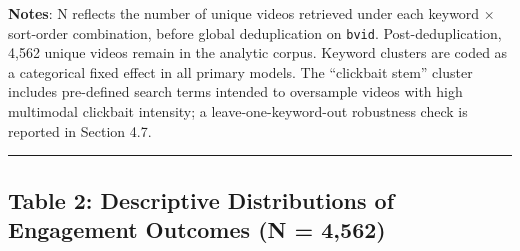 \documentclass[
  12pt,
]{article}
\begin{document}
\textbf{Notes}: N reflects the number of unique videos retrieved under
each keyword × sort-order combination, before global deduplication on
\texttt{bvid}. Post-deduplication, 4,562 unique videos remain in the
analytic corpus. Keyword clusters are coded as a categorical fixed
effect in all primary models. The ``clickbait stem'' cluster includes
pre-defined search terms intended to oversample videos with high
multimodal clickbait intensity; a leave-one-keyword-out robustness check
is reported in Section 4.7.

\begin{center}\rule{0.5\linewidth}{0.5pt}\end{center}

\subsection{Table 2: Descriptive Distributions of Engagement Outcomes (N
=
4,562)}\label{table-2-descriptive-distributions-of-engagement-outcomes-n-4562}
\end{document}
